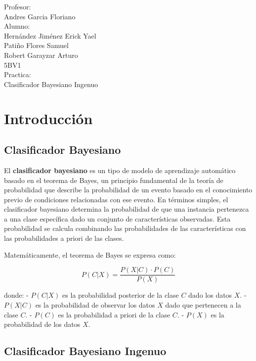 \documentclass{article}
\begin{document}
\begin{titlepage}
\begin{spacing}{2}
\begin{center}
{{{                        Profesor:  \\  Andres Garcia Floriano \\
                        Alumno: \\ Hernández Jiménez Erick Yael \\ Patiño Flores Samuel \\ Robert Garayzar Arturo \\ 
                        5BV1 \\ 
                        Practica:  \\ Clasificador Bayesiano Ingenuo }}}
        \end{center}
        \end{spacing}       
    \end{titlepage}
    
    \pagestyle{fancy}
    \fancyhf{}
    \fancyfoot[C]{\thepage} 
    \renewcommand{\headrulewidth}{0pt} 
    \newpage
    \tableofcontents
    \newpage
    \section{Introducción}
    \subsection{Clasificador Bayesiano}
    El \textbf{clasificador bayesiano} es un tipo de modelo de aprendizaje automático basado en el teorema de Bayes, un principio fundamental de la teoría de probabilidad que describe la probabilidad de un evento basado en el conocimiento previo de condiciones relacionadas con ese evento. En términos simples, el clasificador bayesiano determina la probabilidad de que una instancia pertenezca a una clase específica dado un conjunto de características observadas. Esta probabilidad se calcula combinando las probabilidades de las características con las probabilidades a priori de las clases. 

    Matemáticamente, el teorema de Bayes se expresa como:

    \[
    P(C|X) = \frac{P(X|C) \cdot P(C)}{P(X)}
    \]

donde:
- \( P(C|X) \) es la probabilidad posterior de la clase \( C \) dado los datos \( X \).
- \( P(X|C) \) es la probabilidad de observar los datos \( X \) dado que pertenecen a la clase \( C \).
- \( P(C) \) es la probabilidad a priori de la clase \( C \).
- \( P(X) \) es la probabilidad de los datos \( X \).

\subsection{Clasificador Bayesiano Ingenuo}
\end{document}
